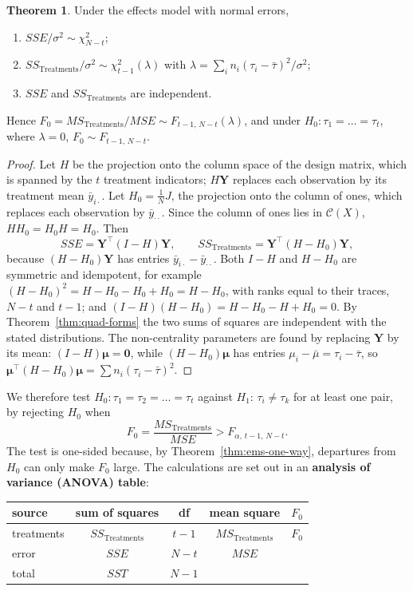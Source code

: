 \documentclass[11pt,a4paper]{article}
\numberwithin{equation}{section}
\theoremstyle{definition}
\newtheorem{thm}{Theorem}[subsection]
\begin{document}
\begin{thm}\label{thm:anova-F}
Under the effects model with normal errors,
\begin{enumerate}[label=(\roman*)]
\item $SSE/\sigma^2 \sim \chi^2_{N-t}$;
\item $SS_{\mathrm{Treatments}}/\sigma^2 \sim \chi^2_{t-1}(\lambda)$ with $\lambda = \sum_in_i(\tau_i - \bar\tau)^2/\sigma^2$;
\item $SSE$ and $SS_{\mathrm{Treatments}}$ are independent.
\end{enumerate}
Hence $F_0 = MS_{\mathrm{Treatments}}/MSE \sim F_{t-1,\,N-t}(\lambda)$, and under $H_0 : \tau_1 = \dots = \tau_t$, where $\lambda = 0$, $F_0 \sim F_{t-1,\,N-t}$.
\end{thm}

\begin{proof}
Let $H$ be the projection onto the column space of the design matrix, which is spanned by the $t$ treatment indicators; $H\mathbf Y$ replaces each
observation by its treatment mean $\bar y_{i\cdot}$. Let $H_0 = \frac1NJ$, the projection onto the column of ones, which replaces each observation by $\bar y_{\cdot\cdot}$.
Since the column of ones lies in $\mathcal C(X)$, $HH_0 = H_0H = H_0$. Then
\[
SSE = \mathbf Y^\top(I - H)\mathbf Y , \qquad SS_{\mathrm{Treatments}} = \mathbf Y^\top(H - H_0)\mathbf Y ,
\]
because $(H - H_0)\mathbf Y$ has entries $\bar y_{i\cdot} - \bar y_{\cdot\cdot}$. Both $I - H$ and $H - H_0$ are symmetric and idempotent, for example
$(H - H_0)^2 = H - H_0 - H_0 + H_0 = H - H_0$, with ranks equal to their traces, $N - t$ and $t - 1$; and $(I - H)(H - H_0) = H - H_0 - H + H_0 = 0$. By
Theorem~\ref{thm:quad-forms} the two sums of squares are independent with the stated distributions. The non-centrality parameters are found
by replacing $\mathbf Y$ by its mean: $(I - H)\boldsymbol\mu = \mathbf 0$, while $(H - H_0)\boldsymbol\mu$ has entries $\mu_i - \bar\mu = \tau_i - \bar\tau$, so
$\boldsymbol\mu^\top(H - H_0)\boldsymbol\mu = \sum n_i(\tau_i - \bar\tau)^2$.
\end{proof}

We therefore test $H_0 : \tau_1 = \tau_2 = \dots = \tau_t$ against $H_1$: $\tau_i \ne \tau_k$ for at least one pair, by rejecting $H_0$ when
\[
F_0 = \frac{MS_{\mathrm{Treatments}}}{MSE} > F_{\alpha,\,t-1,\,N-t} .
\]
The test is one-sided because, by Theorem~\ref{thm:ems-one-way}, departures from $H_0$ can only make $F_0$ large. The calculations are set out in an
\textbf{analysis of variance (ANOVA) table}:
\begin{center}
\begin{tabular}{l|c|c|c|c}
source & sum of squares & df & mean square & $F_0$ \\
\hline
treatments & $SS_{\mathrm{Treatments}}$ & $t - 1$ & $MS_{\mathrm{Treatments}}$ & $F_0$ \\
error & $SSE$ & $N - t$ & $MSE$ & \\
\hline
total & $SST$ & $N - 1$ & &
\end{tabular}
\end{center}
\end{document}
